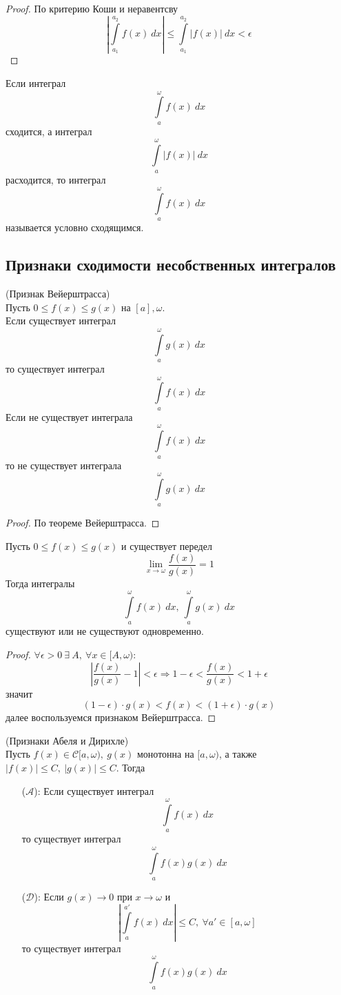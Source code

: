 \begin{proof}
    По критерию Коши и неравентсву
    \[\left|\int\limits_{a_1}^{a_2}f(x)\ dx\right|\leq \int\limits_{a_1}^{a_2}|f(x)|\ dx<\epsilon\]
\end{proof} 
\begin{definition}
    Если интеграл 
    \[\int\limits_{a}^{\omega}f(x)\ dx\]
    сходится, а интеграл 
    \[\int\limits_{a}^{\omega}|f(x)|\ dx\]
    расходится, то интеграл 
    \[\int\limits_{a}^{\omega}f(x)\ dx\]
    называется условно сходящимся.
\end{definition} 
\subsection{Признаки сходимости несобственных интегралов}
\begin{theorem}
    (Признак Вейерштрасса)\\
    Пусть $0\leq f(x)\leq g(x)$ на $[a],\omega$.\\
    Если существует интеграл
    \[\int\limits_{a}^{\omega}g(x)\ dx\]
    то существует интеграл
    \[\int\limits_{a}^{\omega}f(x)\ dx\]
    Если не существует интеграла
    \[\int\limits_{a}^{\omega}f(x)\ dx\]
    то не существует интеграла
    \[\int\limits_{a}^{\omega}g(x)\ dx\]
\end{theorem} 
\begin{proof}
    По теореме Вейерштрасса.
\end{proof}
\begin{theorem}
    Пусть $0\leq f(x)\leq g(x)$ и существует передел
    \[\lim\limits_{x\to \omega}\frac{f(x)}{g(x)}=1\]
    Тогда интегралы
    \[\int\limits_{a}^{\omega}f(x)\ dx,\ \int\limits_{a}^{\omega}g(x)\ dx\] 
    существуют или не существуют одновременно.
\end{theorem} 
\begin{proof}
    $\forall \epsilon>0\ \exists\ A,\ \forall x\in [A, \omega)$:
    \[|\frac{f(x)}{g(x)}-1|<\epsilon \Rightarrow 1-\epsilon<\frac{f(x)}{g(x)}<1+\epsilon\]
    значит
    \[(1-\epsilon)\cdot g(x)<f(x)<(1+\epsilon)\cdot g(x)\]
    далее воспользуемся признаком Вейерштрасса.
\end{proof} 
\begin{theorem}
    (Признаки Абеля и Дирихле)\\
    Пусть $f(x)\in \mathcal{C}[a,\omega),\ g(x)$ монотонна на $[a,\omega)$, а также $|f(x)|\leq C,\ |g(x)|\leq C$. Тогда 
    \begin{itemize}
        \item[($\mathcal{A}$):] Если существует интеграл 
        \[\int\limits_{a}^{\omega}f(x)\ dx\]
        то существует интеграл
        \[\int\limits_{a}^{\omega}f(x)g(x)\ dx\]
        \item[($\mathcal{D}$):] Если $g(x)\to 0$ при $x\to \omega$ и
        \[\left|\int\limits_{a}^{a'}f(x)\ dx\right|\leq C,\ \forall a'\in [a,\omega]\]
        то существует интеграл
        \[\int\limits_{a}^{\omega}f(x)g(x)\ dx\]
    \end{itemize}
\end{theorem} 
